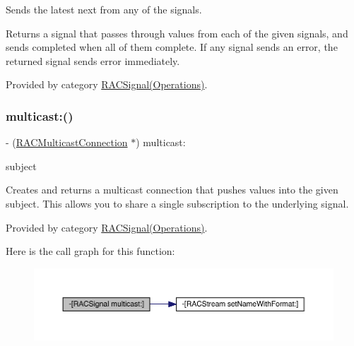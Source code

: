 Sends the latest {\ttfamily next} from any of the signals.

Returns a signal that passes through values from each of the given signals, and sends {\ttfamily completed} when all of them complete. If any signal sends an error, the returned signal sends {\ttfamily error} immediately. 

Provided by category \mbox{\hyperlink{category_r_a_c_signal_07_operations_08_a37d7e9c259ad5253a1f3ff644a86e52b}{R\+A\+C\+Signal(\+Operations)}}.

\mbox{\label{interface_r_a_c_signal_a55b43f4fbef7e430a4587ce13eab18cb}} 
\subsubsection{\texorpdfstring{multicast\+:()}{multicast:()}\hspace{0.1cm}{\footnotesize\ttfamily [1/3]}}
{\footnotesize\ttfamily -\/ (\mbox{\hyperlink{interface_r_a_c_multicast_connection}{R\+A\+C\+Multicast\+Connection}} $\ast$) multicast\+: \begin{DoxyParamCaption}\item[{(\mbox{\hyperlink{interface_r_a_c_subject}{R\+A\+C\+Subject}} $\ast$)}]{subject }\end{DoxyParamCaption}}

Creates and returns a multicast connection that pushes values into the given subject. This allows you to share a single subscription to the underlying signal. 

Provided by category \mbox{\hyperlink{category_r_a_c_signal_07_operations_08_a55b43f4fbef7e430a4587ce13eab18cb}{R\+A\+C\+Signal(\+Operations)}}.

Here is the call graph for this function\+:\nopagebreak
\begin{figure}[H]
\begin{center}
\leavevmode
\includegraphics[width=350pt]{interface_r_a_c_signal_a55b43f4fbef7e430a4587ce13eab18cb_cgraph}
\end{center}
\end{figure}
\mbox{\label{interface_r_a_c_signal_a55b43f4fbef7e430a4587ce13eab18cb}} 
